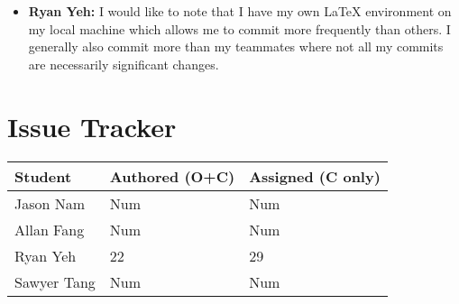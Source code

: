 \documentclass{article}
\begin{document}

\begin{itemize}
  \item \textbf{Ryan Yeh:} I would like to note that I have my own \LaTeX{} environment on my local machine
  which allows me to commit more frequently than others. I generally also commit more than my teammates where
  not all my commits are necessarily significant changes.
\end{itemize}


\section{Issue Tracker}


\begin{table}[H]
\centering
\begin{tabular}{lll}
\toprule
\textbf{Student} & \textbf{Authored (O+C)} & \textbf{Assigned (C only)}\\
\midrule
Jason Nam & Num & Num \\
Allan Fang & Num & Num \\
Ryan Yeh & 22 & 29 \\
Sawyer Tang & Num & Num \\
\bottomrule
\end{tabular}
\end{table}

\end{document}
